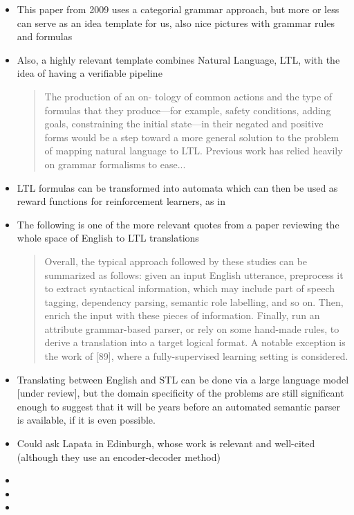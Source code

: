 \documentclass[a4paper, 11pt]{article}
\begin{document}
\begin{itemize}



\item This paper \cite{5152776} from 2009 uses a categorial grammar approach, but more or less
  can serve as an idea template for us, also nice pictures with grammar rules
  and formulas
\item Also, a highly relevant template combines Natural Language, LTL, with the
  idea of having a verifiable pipeline \cite{provCorrectNatControl} 

\begin{quote}
The production of an on-
tology of common actions and the type of formulas that
they produce—for example, safety conditions, adding goals,
constraining the initial state—in their negated and positive
forms would be a step toward a more general solution to
the problem of mapping natural language to LTL. Previous
work has relied heavily on grammar formalisms to ease...
\cite{provCorrectNatControl} 
\end{quote}

\item LTL formulas can be transformed into automata which can then be used as reward functions for reinforcement learners, as in \cite{ltlRein}

\item  The following is one of the more relevant quotes from a paper reviewing
  the whole space of English to LTL translations
  \begin{quote}
Overall, the typical approach followed by these studies can be summarized as follows:
given an input English utterance, preprocess it to extract syntactical information, which may
include part of speech tagging, dependency parsing, semantic role labelling, and so on. Then,
enrich the input with these pieces of information. Finally, run an attribute grammar-based
parser, or rely on some hand-made rules, to derive a translation into a target logical format.
A notable exception is the work of [89], where a fully-supervised learning setting is considered.
\cite{brunello_et_al}
\end{quote}
\item Translating between English and STL can be done via a large language model 
\cite{he2021english} [under review], but the domain specificity of the problems
are still significant enough to suggest that it will be years before an
automated semantic parser is available, if it is even possible. 
\item Could ask Lapata in Edinburgh, whose work \cite{dong-lapata-2016-language}
  is relevant and well-cited (although they use an encoder-decoder method)
\item
\item
\item

\end{itemize}
\end{document}
